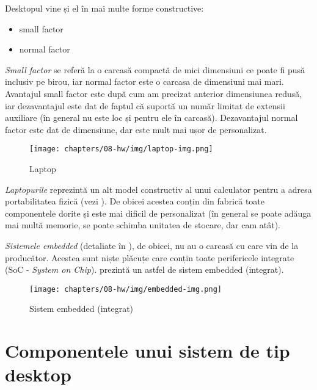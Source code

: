 Desktopul vine și el în mai multe forme constructive:

\begin{itemize}
  \item small factor
  \item normal factor
\end{itemize}

\textit{Small factor} se referă la o carcasă compactă de mici dimensiuni ce
poate fi pusă inclusiv pe birou, iar normal factor este o carcasa de dimensiuni
mai mari. Avantajul small factor este după cum am precizat anterior
dimensiunea redusă, iar dezavantajul este dat de faptul că suportă un număr
limitat de extensii auxiliare (în general nu este loc și pentru ele în carcasă).
Dezavantajul normal factor este dat de dimensiune, dar este mult mai ușor de
personalizat.

\begin{figure}[!htbp]
  \centering
  \texttt{[image: chapters/08-hw/img/laptop-img.png]}
  \caption{Laptop\protect\footnotemark}
  \label{fig:hw:laptop}
\end{figure}

\textit{Laptopurile} reprezintă un alt model constructiv al unui calculator
pentru a adresa portabilitatea fizică (vezi ). De
obicei acestea conțin din fabrică toate componentele dorite și este mai dificil
de personalizat (în general se poate adăuga mai multă memorie, se poate schimba
unitatea de stocare, dar cam atât).

\textit{Sistemele embedded} (detaliate în ), de obicei,
nu au o carcasă cu care vin de la producător. Acestea sunt niște plăcuțe care
conțin toate perifericele integrate (SoC - \textit{System on Chip}).
 prezintă un astfel de sistem embedded
(integrat).

\begin{figure}[!htbp]
  \centering
  \texttt{[image: chapters/08-hw/img/embedded-img.png]}
  \caption{Sistem embedded (integrat)\protect\footnotemark}
  \label{fig:hw:embed}
\end{figure}

\section{Componentele unui sistem de tip desktop}
\label{sec:hw:components}

